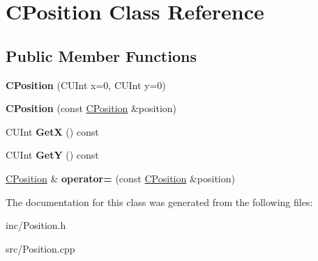 \hypertarget{classCPosition}{\section{C\-Position Class Reference}
\label{classCPosition}
}
\subsection*{Public Member Functions}
\begin{DoxyCompactItemize}
\item 
\hypertarget{classCPosition_a9e6eddbe9173d945fc75fc7493608663}{{\bfseries C\-Position} (C\-U\-Int x=0, C\-U\-Int y=0)}\label{classCPosition_a9e6eddbe9173d945fc75fc7493608663}

\item 
\hypertarget{classCPosition_a0d881df947c8609a2740fda0fd7d3c87}{{\bfseries C\-Position} (const \hyperlink{classCPosition}{C\-Position} \&position)}\label{classCPosition_a0d881df947c8609a2740fda0fd7d3c87}

\item 
\hypertarget{classCPosition_aadf42aa59912d16baef3639aa4706f35}{C\-U\-Int {\bfseries Get\-X} () const }\label{classCPosition_aadf42aa59912d16baef3639aa4706f35}

\item 
\hypertarget{classCPosition_acc5ed328ccc5d8f02e26313f9c902f00}{C\-U\-Int {\bfseries Get\-Y} () const }\label{classCPosition_acc5ed328ccc5d8f02e26313f9c902f00}

\item 
\hypertarget{classCPosition_a89cf175b15b096c7e4931b4e4adc0500}{\hyperlink{classCPosition}{C\-Position} \& {\bfseries operator=} (const \hyperlink{classCPosition}{C\-Position} \&position)}\label{classCPosition_a89cf175b15b096c7e4931b4e4adc0500}

\end{DoxyCompactItemize}


The documentation for this class was generated from the following files\-:\begin{DoxyCompactItemize}
\item 
inc/Position.\-h\item 
src/Position.\-cpp\end{DoxyCompactItemize}
